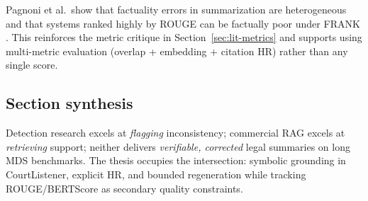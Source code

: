 Pagnoni et al.\ show that factuality errors in summarization are heterogeneous and that systems ranked highly by ROUGE can be factually poor under FRANK \cite{pagnoni2021factuality}. This reinforces the metric critique in Section~\ref{sec:lit-metrics} and supports using multi-metric evaluation (overlap + embedding + citation HR) rather than any single score.

\subsection{Section synthesis}

Detection research excels at \emph{flagging} inconsistency; commercial RAG excels at \emph{retrieving} support; neither delivers \emph{verifiable, corrected} legal summaries on long MDS benchmarks. The thesis occupies the intersection: symbolic grounding in CourtListener, explicit HR, and bounded regeneration while tracking ROUGE/BERTScore as secondary quality constraints.
